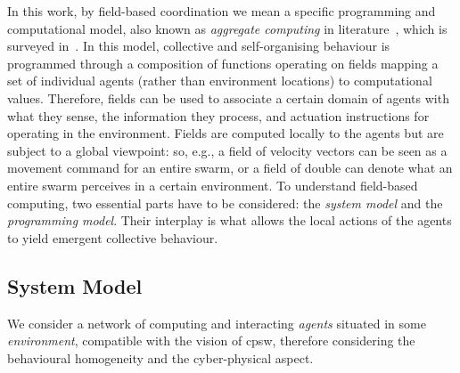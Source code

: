 In this work, by field-based coordination we mean a specific programming and computational model,
 also known as \emph{aggregate computing} in literature~\cite{aggregatecomputing},
 which is surveyed in~\cite{DBLP:journals/jlap/ViroliBDACP19}.
In this model,  
 collective and self-organising behaviour
 is programmed through a composition
 of functions operating on fields
 mapping a set of individual agents (rather than environment locations)
 to computational values.
%
Therefore, fields can be used to associate a certain domain of agents
 with what they sense, the information they process, and actuation instructions for operating in the environment.
%
Fields are computed locally to the agents
 but are subject to a global viewpoint:
 so, e.g., a field of velocity vectors can be seen as a movement command for an entire swarm, or
 a field of double can denote what an entire swarm perceives in a certain environment.
%
To understand field-based computing,
 two essential parts have to be considered: the \emph{system model}
 and the \emph{programming model}.
 Their interplay is what allows the local actions of the agents
 to yield emergent collective behaviour.

\subsection{System Model}\label{ssec:background:sysmodel}
We consider a network of computing and interacting \emph{agents} situated in some \emph{environment},
 compatible with the vision of \acf{cpsw}, therefore considering the behavioural homogeneity and the 
 cyber-physical aspect. 

